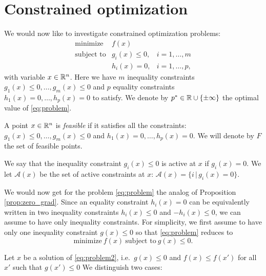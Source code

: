 \documentclass[11pt,nocut]{article}
\begin{document}
\section{Constrained optimization}

We would now like to investigate constrained optimization problems:
\begin{equation}\label{eq:problem}
	\begin{array}{lll}
		\text{minimize} & f(x) & \\
		\text{subject to} & g_i(x) \leq 0, & i=1, \dots, m \\
						  & h_i(x) = 0, & i=1, \dots, p,
	\end{array}
\end{equation}
with variable $x \in \mathbb{R}^n$.
Here we have $m$ inequality constraints $g_1(x) \leq 0, \dots, g_m(x)\leq  0$ and $p$ equality constraints $h_1(x) = 0, \dots, h_p(x) = 0$ to satisfy.
We denote by $p^* \in \mathbb{R} \cup \{\pm \infty\}$ the optimal value of \eqref{eq:problem}.

\begin{definition}
	A point $x \in \mathbb{R}^n$ is \emph{feasible} if it satisfies all the constraints: $g_1(x) \leq 0, \dots, g_m(x)\leq  0$ and $h_1(x) = 0, \dots, h_p(x) = 0$. We will denote by $F$ the set of feasible points.
\end{definition}

\begin{definition}
	We say that the inequality constraint $g_i(x) \leq 0$ is active at $x$ if $g_i(x) = 0$.
	We let $\mathcal{A}(x)$ be the set of active constraints at $x$: $\mathcal{A}(x) = \{ i \, | \, g_i(x) = 0\}$.
\end{definition}
We would now get for the problem \eqref{eq:problem} the analog of Proposition \ref{prop:zero_grad}.
Since an equality constraint $h_i(x) = 0$ can be equivalently written in two inequality constraints $h_i(x) \leq 0$ and $-h_i(x) \leq 0$, we can assume to have only inequality constraints.
For simplicity, we first assume to have only one inequality constraint $g(x) \leq 0$ so that \eqref{eq:problem} reduces to
\begin{equation}\label{eq:problem2}
	\text{minimize} \ f(x) \ \text{subject to} \ g(x) \leq 0.
\end{equation}


Let $x$ be a solution of \eqref{eq:problem2}, i.e.\ $g(x) \leq 0$ and $f(x) \leq f(x')$ for all $x'$ such that $g(x')\leq0$
We distinguish two cases:
\end{document}
